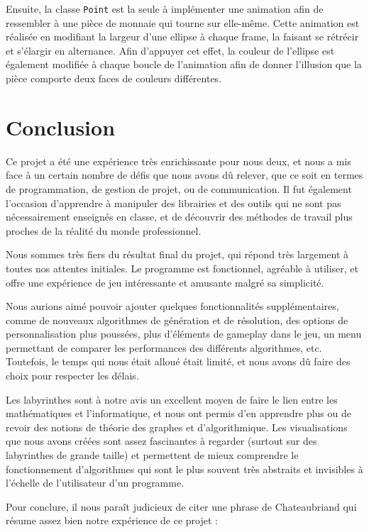 \documentclass[12pt]{scrreprt} %
\begin{document}
Ensuite, la classe \texttt{Point} est la seule à implémenter une animation afin de ressembler à une pièce de monnaie qui tourne sur elle-même. Cette animation est réalisée en modifiant la largeur d'une ellipse à chaque frame, la faisant se rétrécir et s'élargir en alternance. Afin d'appuyer cet effet, la couleur de l'ellipse est également modifiée à chaque boucle de l'animation afin de donner l'illusion que la pièce comporte deux faces de couleurs différentes.


\chapter*{Conclusion}

Ce projet a été une expérience très enrichissante pour nous deux, et nous a mis face à un certain nombre de défis que nous avons dû relever, que ce soit en termes de programmation, de gestion de projet, ou de communication. Il fut également l'occasion d'apprendre à manipuler des librairies et des outils qui ne sont pas nécessairement enseignés en classe, et de découvrir des méthodes de travail plus proches de la réalité du monde professionnel.

Nous sommes très fiers du résultat final du projet, qui répond très largement à toutes nos attentes initiales. Le programme est fonctionnel, agréable à utiliser, et offre une expérience de jeu intéressante et amusante malgré sa simplicité.

Nous aurions aimé pouvoir ajouter quelques fonctionnalités supplémentaires, comme de nouveaux algorithmes de génération et de résolution, des options de personnalisation plus poussées, plus d'éléments de gameplay dans le jeu, un menu permettant de comparer les performances des différents algorithmes, etc. Toutefois, le temps qui nous était alloué était limité, et nous avons dû faire des choix pour respecter les délais.

Les labyrinthes sont à notre avis un excellent moyen de faire le lien entre les mathématiques et l'informatique, et nous ont permis d'en apprendre plus ou de revoir des notions de théorie des graphes et d'algorithmique. Les visualisations que nous avons créées sont assez fascinantes à regarder (surtout sur des labyrinthes de grande taille) et permettent de mieux comprendre le fonctionnement d'algorithmes qui sont le plus souvent très abstraits et invisibles à l'échelle de l'utilisateur d'un programme.

Pour conclure, il nous paraît judicieux de citer une phrase de Chateaubriand qui résume assez bien notre expérience de ce projet :
\end{document}
